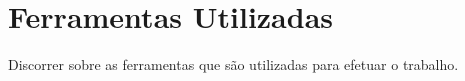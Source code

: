 \section{Ferramentas Utilizadas}
Discorrer sobre as ferramentas que são utilizadas para efetuar o trabalho.